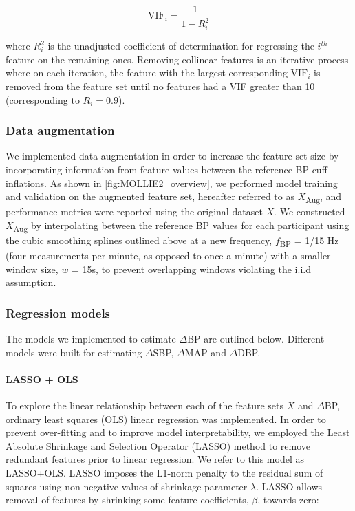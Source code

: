 \documentclass[fleqn,10pt]{wlscirep}
\begin{document}
\begin{equation}
    \text{VIF}_i = \frac{1}{1 - R_i^2}
\end{equation}

where $R_i^2$ is the unadjusted coefficient of determination for regressing the $i^{th}$ feature on the remaining ones. Removing collinear features is an iterative process where on each iteration, the feature with the largest corresponding $\text{VIF}_i$ is removed from the feature set until no features had a VIF greater than 10 (corresponding to $R_i = 0.9$)\cite{Kim2019}.




\subsubsection{Data augmentation}

We implemented data augmentation in order to increase the feature set size by incorporating information from feature values between the reference BP cuff inflations. As shown in \cref{fig:MOLLIE2_overview}, we performed model training and validation on the augmented feature set, hereafter referred to as $X$\textsubscript{Aug}, and performance metrics were reported using the original dataset $X$. We constructed $X$\textsubscript{Aug} by interpolating between the reference BP values for each participant using the cubic smoothing splines outlined above at a new frequency, $f$\textsubscript{BP} = 1/15 Hz (four measurements per minute, as opposed to once a minute) with a smaller window size, $w$ = 15s, to prevent overlapping windows violating the i.i.d assumption.


\subsubsection{Regression models}

The models we implemented to estimate $\Delta$BP are outlined below. Different models were built for estimating $\Delta$SBP, $\Delta$MAP and $\Delta$DBP.

\paragraph{LASSO + OLS}

To explore the linear relationship between each of the feature sets $X$ and $\Delta$BP, ordinary least squares (OLS) linear regression was implemented. In order to prevent over-fitting %
and to improve model interpretability, we employed the Least Absolute Shrinkage and Selection Operator (LASSO) method to remove redundant features prior to linear regression. We refer to this model as LASSO+OLS. LASSO imposes the L1-norm penalty to the residual sum of squares using non-negative values of shrinkage parameter $\lambda$. LASSO allows removal of features by shrinking some feature coefficients, $\beta$, towards zero: 
\end{document}
